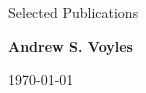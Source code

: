 \documentclass{resume2} %
\newif\ifshort
\begin{document}

\shorttrue 

\begin{center}
{\Large Selected Publications}

{\large \textbf{Andrew S. Voyles}}

\today
\end{center} 

\end{document}
